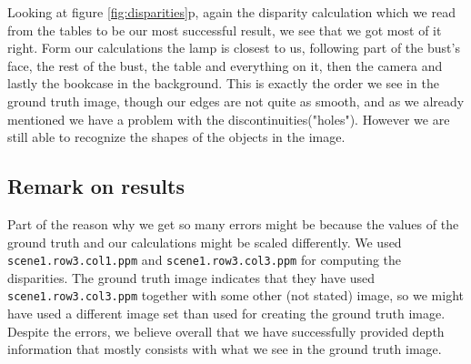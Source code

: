 \documentclass[12pt,a4paper,oneside,final]{article}
\begin{document}
Looking at figure \ref{fig:disparities}p, again the disparity calculation which we read from the tables to be our most successful result, we see that we got most of it right. Form our calculations the lamp is closest to us, following part of the bust's face, the rest of the bust, the table and everything on it, then the camera and lastly the bookcase in the background. This is exactly the order we see in the ground truth image, though our edges are not quite as smooth, and as we already mentioned we have a problem with the discontinuities("holes"). However we are still able to recognize the shapes of the objects in the image. 

\subsection{Remark on results}
Part of the reason why we get so many errors might be because the values of the ground truth and our calculations might be scaled differently. We used \texttt{scene1.row3.col1.ppm} and \texttt{scene1.row3.col3.ppm} for computing the disparities. The ground truth image indicates that they have used \texttt{scene1.row3.col3.ppm} together with some other (not stated) image, so we might have used a different image set than used for creating the ground truth image. Despite the errors, we believe overall that we have successfully provided depth information that mostly consists with what we see in the ground truth image.
	
\end{document}
